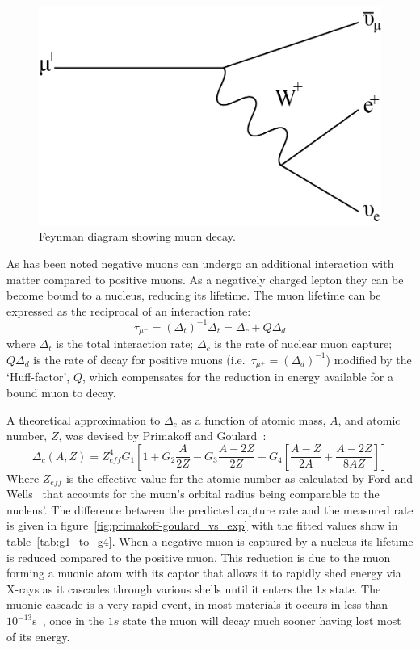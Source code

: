 \begin{figure}[hptb]
  \centering
    \includegraphics[scale=1]{images/muon_decay_feynmann.png}
  \caption{Feynman diagram showing muon decay.}
  \label{fig:muon_decay_feynmann}
\end{figure}

As has been noted negative muons can undergo an additional interaction with matter compared to positive muons. As a negatively charged lepton they can be become bound to a nucleus, reducing its lifetime. The muon lifetime can be expressed as the reciprocal of an interaction rate:
\begin{equation}\label{eq:capture_rate}
  \tau_{\mu^-} = (\Delta_t)^{-1}
  \Delta_t = \Delta_c + Q\Delta_d
\end{equation}
where \( \Delta_t \) is the total interaction rate; \( \Delta_c \) is the rate of nuclear muon capture; \( Q\Delta_d \) is the rate of decay for positive muons (i.e.\ \( \tau_{\mu^+} = (\Delta_d)^{-1}  \)) modified by the `Huff-factor', \( Q \), which compensates for the reduction in energy available for a bound muon to decay. 

A theoretical approximation to \( \Delta_c \) as a function of atomic mass, \( A \), and atomic number, \( Z \), was devised by Primakoff and Goulard~\cite{primakoff_and_goulard}:
\begin{equation}\label{eq:primakoff_and_goulard}
  \Delta_c(A,Z)=Z^4_{eff} G_1 \left[ 1 + G_2 \frac{A}{2Z} - G_3 \frac{A-2Z}{2Z} - G_4 \left[\frac{A-Z}{2A} + \frac{A-2Z}{8AZ} \right] \right]
\end{equation}
Where \( Z_{eff} \) is the effective value for the atomic number as calculated by Ford and Wells~\cite{Wells and ford Zeff} that accounts for the muon's orbital radius being comparable to the nucleus'. The difference between the predicted capture rate and the measured rate is given in figure~\ref{fig:primakoff-goulard_vs_exp} with the fitted values show in table~\ref{tab:g1_to_g4}. When a negative muon is captured by a nucleus its lifetime is reduced compared to the positive muon. This reduction is due to the muon forming a muonic atom with its captor that allows it to rapidly shed energy via X-rays as it cascades through various shells until it enters the \( 1s \) state. The muonic cascade is a very rapid event, in most materials it occurs in less than \( 10^{-13}\)s~\cite{nuclear physics of muon capture}, once in the \( 1s \) state the muon will decay much sooner having lost most of its energy.

